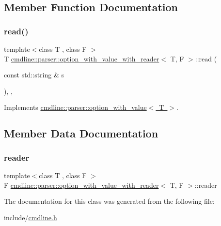 \subsection{Member Function Documentation}
\mbox{\label{classcmdline_1_1parser_1_1option__with__value__with__reader_a47db1ae274bc54b14d8f4e414ce3549a}} 
\subsubsection{\texorpdfstring{read()}{read()}}
{\footnotesize\ttfamily template$<$class T , class F $>$ \\
T \mbox{\hyperlink{classcmdline_1_1parser_1_1option__with__value__with__reader}{cmdline\+::parser\+::option\+\_\+with\+\_\+value\+\_\+with\+\_\+reader}}$<$ T, F $>$\+::read (\begin{DoxyParamCaption}\item[{const std\+::string \&}]{s }\end{DoxyParamCaption})\hspace{0.3cm}{\ttfamily [inline]}, {\ttfamily [private]}, {\ttfamily [virtual]}}



Implements \mbox{\hyperlink{classcmdline_1_1parser_1_1option__with__value_acb922af893f383b1e00d355d7f3b6b75}{cmdline\+::parser\+::option\+\_\+with\+\_\+value$<$ T $>$}}.



\subsection{Member Data Documentation}
\mbox{\label{classcmdline_1_1parser_1_1option__with__value__with__reader_a1d06ee0129f99751c6461b7fe3dc844b}} 
\subsubsection{\texorpdfstring{reader}{reader}}
{\footnotesize\ttfamily template$<$class T , class F $>$ \\
F \mbox{\hyperlink{classcmdline_1_1parser_1_1option__with__value__with__reader}{cmdline\+::parser\+::option\+\_\+with\+\_\+value\+\_\+with\+\_\+reader}}$<$ T, F $>$\+::reader\hspace{0.3cm}{\ttfamily [private]}}



The documentation for this class was generated from the following file\+:\begin{DoxyCompactItemize}
\item 
include/\mbox{\hyperlink{cmdline_8h}{cmdline.\+h}}\end{DoxyCompactItemize}
